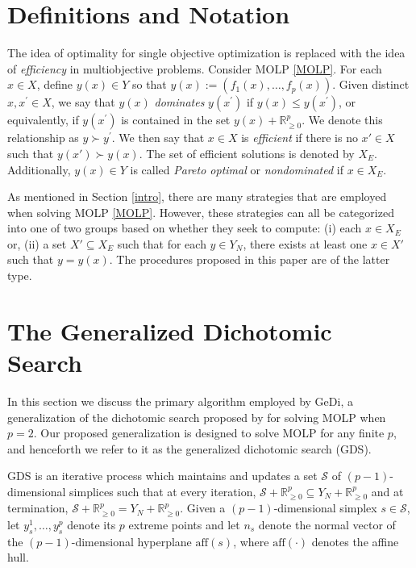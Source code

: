 \documentclass[12pt]{article}
\newcommand{\R}{\mathbb{R}}
\newcommand{\dom}{\succ}
\renewcommand{\S}{\mathcal{S}}
\newcommand{\nonneg}{\R^{p}_{\ge 0}}
\newcommand{\aff}{\text{aff}}
\begin{document}
\section{Definitions and Notation}\label{sec:prelim}
The idea of optimality for single objective optimization is replaced with the idea of \emph{efficiency} in multiobjective problems. Consider MOLP \eqref{MOLP}. For each $x \in X$, define $y(x) \in Y$ so that $y(x) := (f_{1}(x), \dots, f_{p}(x))$. Given distinct $x,x^{\prime} \in X$, we say that $y(x)$ \emph{dominates} $y(x^{\prime})$ if $y(x) \leq y(x^{\prime})$, or equivalently, if $y(x^{\prime})$ is contained in the set $y(x) + \nonneg$. We denote this relationship as $y \dom y^{\prime}$. We then say that $x\in X$ is \emph{efficient} if there is no $x' \in X$ such that $y(x') \dom y(x)$. The set of efficient solutions is denoted by $X_E$. Additionally, $y(x) \in Y$ is called \emph{Pareto optimal} or \emph{nondominated} if $x \in X_{E}$. 

As mentioned in Section \ref{intro}, there are many strategies that are employed when solving MOLP \eqref{MOLP}. However, these strategies can all be categorized into one of two groups based on whether they seek to compute: (i) each $x \in X_E$ or, (ii) a set $X' \subseteq X_E$ such that for each $y \in Y_N$, there exists at least one $x \in X'$ such that $y = y(x)$. The procedures proposed in this paper are of the latter type. 

\section{The Generalized Dichotomic Search}\label{GeDi}

In this section we discuss the primary algorithm employed by GeDi, a generalization of the dichotomic search proposed by \citet{aneja1979bicriteria} for solving MOLP when $p=2$. Our proposed generalization is designed to solve MOLP for any finite $p$, and henceforth we refer to it as the generalized dichotomic search (GDS).

GDS is an iterative process which maintains and updates a set $\S$ of $(p-1)$-dimensional simplices such that at every iteration, $\S + \nonneg \subseteq Y_N + \nonneg$ and at termination, $\S + \nonneg = Y_N + \nonneg$. Given a $(p-1)$-dimensional simplex $s \in \S$, let $y^1_s, \dots, y^p_s$ denote its $p$ extreme points and let $n_s$ denote the normal vector of the $(p-1)$-dimensional hyperplane $\aff(s)$, where $\aff(\cdot)$ denotes the affine hull. 
\end{document}
